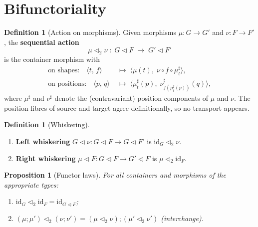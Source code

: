 \documentclass[11pt,a4paper]{article}
\theoremstyle{plain}
\newtheorem{proposition}[theorem]{Proposition}
\theoremstyle{definition}
\newtheorem{definition}[theorem]{Definition}
\newcommand{\id}{\mathrm{id}}
\newcommand{\seq}{\mathbin{\triangleleft}}
\begin{document}
\section{Bifunctoriality}

\begin{definition}[Action on morphisms]\label{def:seq2}
Given morphisms $\mu : G \to G'$ and $\nu : F \to F'$, the
\textbf{sequential action}
\[
  \mu \seq_2 \nu
  \;:\;
  G \seq F \;\longrightarrow\; G' \seq F'
\]
is the container morphism with
\begin{align}
  \text{on shapes:}\quad
  \bigl\langle t,\, f \bigr\rangle
  &\;\longmapsto\;
  \bigl\langle
    \mu(t),\;
    \nu \circ f \circ \mu^\sharp_t
  \bigr\rangle, \\[4pt]
  \text{on positions:}\quad
  \bigl\langle p,\, q \bigr\rangle
  &\;\longmapsto\;
  \bigl\langle
    \mu^\sharp_t(p),\;
    \nu^\sharp_{f(\mu^\sharp_t(p))}(q)
  \bigr\rangle,
\end{align}
where $\mu^\sharp$ and $\nu^\sharp$ denote the (contravariant) position
components of $\mu$ and $\nu$. The position fibres of source and target
agree definitionally, so no transport appears.
\end{definition}

\begin{definition}[Whiskering]\label{def:whisker}
\begin{enumerate}
  \item \textbf{Left whiskering}
        $G \seq \nu : G \seq F \to G \seq F'$ is
        $\id_G \seq_2 \nu$.
  \item \textbf{Right whiskering}
        $\mu \seq F : G \seq F \to G' \seq F$ is
        $\mu \seq_2 \id_F$.
\end{enumerate}
\end{definition}

\begin{proposition}[Functor laws]\label{prop:seq2-laws}
For all containers and morphisms of the appropriate types:
\begin{enumerate}
  \item $\id_G \seq_2 \id_F = \id_{G \seq F}$;
  \item $(\mu \mathbin{;}\mu') \seq_2 (\nu \mathbin{;}\nu')
        = (\mu \seq_2 \nu) \mathbin{;} (\mu' \seq_2 \nu')$
        (interchange).
\end{enumerate}
\end{proposition}
\end{document}
